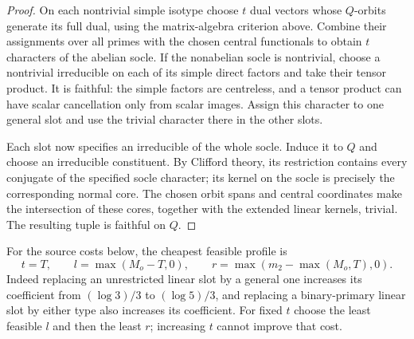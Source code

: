 \begin{proof}
On each nontrivial simple isotype choose $t$ dual vectors whose
$Q$-orbits generate its full dual, using the matrix-algebra criterion
above. Combine their assignments over all primes with the chosen
central functionals to obtain $t$ characters of the abelian socle.
If the nonabelian socle is nontrivial, choose a nontrivial irreducible
on each of its simple direct factors and take their tensor product.
It is faithful: the simple factors are centreless, and a tensor product
can have scalar cancellation only from scalar images. Assign this
character to one general slot and use the trivial character there in
the other slots.

Each slot now specifies an irreducible of the whole socle. Induce it
to $Q$ and choose an irreducible constituent. By Clifford theory, its
restriction contains every conjugate of the specified socle character;
its kernel on the socle is precisely the corresponding normal core.
The chosen orbit spans and central coordinates make the intersection
of these cores, together with the extended linear kernels, trivial.
The resulting tuple is faithful on $Q$.
\end{proof}

For the source costs below, the cheapest feasible profile is
\begin{equation}\label{eq:cheapest-character-profile}
 t=T,\qquad l=\max(M_o-T,0),\qquad
 r=\max(m_2-\max(M_o,T),0).
\end{equation}
Indeed replacing an unrestricted linear slot by a general one increases
its coefficient from $(\log3)/3$ to $(\log5)/3$, and replacing a
binary-primary linear slot by either type also increases its coefficient.
For fixed $t$ choose the least feasible $l$ and then the least $r$;
increasing $t$ cannot improve that cost.


